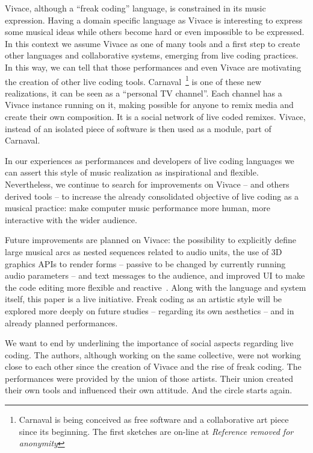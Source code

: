 \documentclass[letterpaper, 12pt]{article}
\begin{document}
Vivace, although a ``freak coding'' language, is constrained in its
music expression. Having a domain specific language as Vivace is
interesting to express some musical ideas while others become hard or
even impossible to be expressed. In this context we assume Vivace as
one of many tools and a first step to create other languages and
collaborative systems, emerging from live coding practices. In this
way, we can tell that those performances and even Vivace are
motivating the creation of other live coding
tools. Carnaval~\footnote{Carnaval is being conceived as free software
  and a collaborative art piece since its beginning. The first
  sketches are on-line at \textit{Reference removed for anonymity}} is
one of these new realizations, it can be seen as a ``personal TV
channel''. Each channel has a Vivace instance running on it, making
possible for anyone to remix media and create their own
composition. It is a social network of live coded remixes. Vivace,
instead of an isolated piece of software is then used as a module,
part of Carnaval.

In our experiences as performances and developers of live coding
languages we can assert this style of music realization as
inspirational and flexible. Nevertheless, we continue to search for
improvements on Vivace -- and others derived tools -- to increase the
already consolidated objective of live coding as a musical practice:
make computer music performance more human, more interactive with the
wider audience.

Future improvements are planned on Vivace: the possibility to
explicitly define large musical arcs as nested sequences related to
audio units, the use of 3D graphics APIs to render forms -- passive to
be changed by currently running audio parameters -- and text messages
to the audience, and improved UI to make the code editing more
flexible and reactive~\citep{brett}.  Along with the language and
system itself, this paper is a live initiative. Freak coding as an
artistic style will be explored more deeply on future studies --
regarding its own aesthetics -- and in already planned performances.

We want to end by underlining the importance of social aspects
regarding live coding. The authors, although working on the same
collective, were not working close to each other since the creation of
Vivace and the rise of freak coding. The performances were provided by
the union of those artists. Their union created their own tools and
influenced their own attitude. And the circle starts again.



\end{document}
